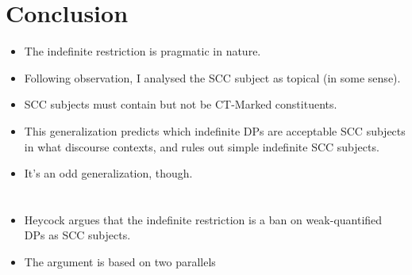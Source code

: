 \documentclass[letterpaper]{article}
\begin{document}
\section{Conclusion}
\begin{itemize}
  \item The indefinite restriction is pragmatic in nature.
  \item Following  observation, I analysed the SCC subject as topical (in some sense).
  \item SCC subjects must contain but not be CT-Marked constituents.
  \item This generalization predicts which indefinite DPs are acceptable SCC subjects in what discourse contexts, and rules out simple indefinite SCC subjects.
  \item It's an odd generalization, though.
\end{itemize}
\printbibliography
\appendix
\section{\textcite{heycock2012specification}}\label{sec:Heycock}
\begin{itemize}
  \item Heycock argues that the indefinite restriction is a ban on weak-quantified DPs as SCC subjects.
  \item The argument is based on two parallels 
\end{itemize}
\end{document}
